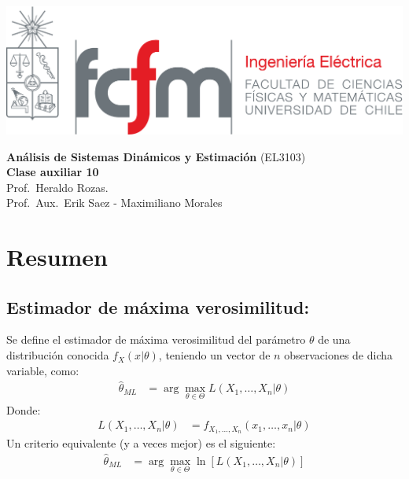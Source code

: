 \documentclass[
  11pt,
  letterpaper,
   addpoints,
  ]{exam}
\begin{document}
\noindent
\begin{minipage}{0.47\textwidth}
\includegraphics[width=\textwidth]{../fcfm_die}
\end{minipage}
\begin{minipage}{0.53\textwidth}
\begin{center} 
\large\textbf{Análisis de Sistemas Dinámicos y Estimación} (EL3103) \\
\large\textbf{Clase auxiliar 10} \\
\normalsize Prof.~Heraldo Rozas.\\
\normalsize Prof.~Aux.~Erik Saez - Maximiliano Morales
\end{center}
\end{minipage}

\vspace{0.5cm}
\noindent
\vspace{.85cm}
\section{Resumen}

\subsection*{Estimador de máxima verosimilitud:}

Se define el estimador de máxima verosimilitud del parámetro $\theta$ de una distribución conocida $f_X(x|\theta)$, teniendo un vector de $n$ observaciones de dicha variable, como:
\begin{align}
\hat{\theta}_{ML} &= \arg \max_{\theta \in \Theta} L(X_1, \dots, X_n|\theta)
\end{align}
Donde:
\begin{align}
L(X_1, \dots, X_n|\theta) &= f_{X_1,\dots,X_n}(x_1, \dots, x_n|\theta)
\end{align}
Un criterio equivalente (y a veces mejor) es el siguiente:
\begin{align}
\hat{\theta}_{ML} &= \arg \max_{\theta \in \Theta} \ln[L(X_1, \dots, X_n|\theta)]
\end{align}
\end{document}
